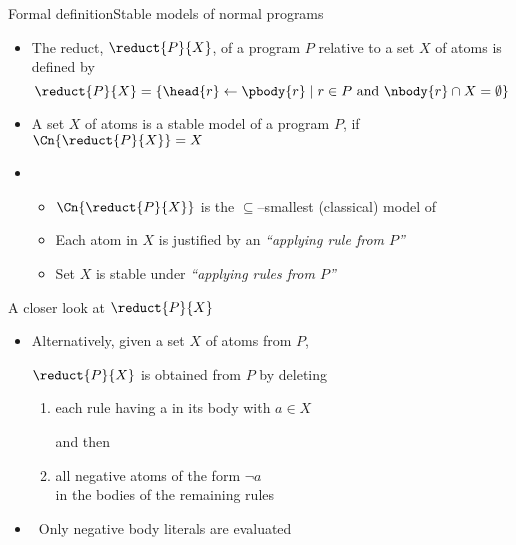 \begin{frame}{Formal definition}{Stable models of normal programs}

  \begin{itemize}
  \item <1-> The \alert{reduct}, $\reduct{P}{X}$, of a program $P$ relative to
    a set $X$ of atoms is defined by
    \[
    \reduct{P}{X}
    =
    \{\head{r}\leftarrow\pbody{r} \mid r\in P \text{ and } \nbody{r}\cap X=\emptyset\}
    \]

  \item <2-> A set $X$ of atoms is a \alert{stable model} of a program $P$,
    if $\Cn{\reduct{P}{X}}=X$
    \bigskip
    \bigskip
  \item<3-> 
    \begin{itemize}
    \item<3-> $\Cn{\reduct{P}{X}}$ is the $\subseteq$--smallest (classical) model of 
      \medskip
    \item<4-> Each atom in $X$ is justified by an \emph{``applying rule from $P$''}
    \item<4-> Set $X$ is \alert{stable} under \emph{``applying rules from $P$''}
    \end{itemize}
  \end{itemize}
\end{frame}
\begin{frame}{A closer look at ${\reduct{P}{X}}$}

  \bigskip
  \begin{itemize}
  \item<1->
    Alternatively, given a set $X$ of atoms from $P$,

    \bigskip

    $\reduct{P}{X}$ is obtained from $P$ by \alert<1>{deleting}

    \medskip

    \begin{enumerate}\normalsize
    \item each \alert<1>{rule} having \alert<2>{\neg a} in its body with $a\in X$

      and then

      \smallskip

    \item all \alert<1>{negative atoms} of the form \alert<2>{$\neg a$}  \\
      in the bodies of the remaining rules
    \end{enumerate}
    \bigskip
  \item<2->  \ Only \alert<2>{negative body literals} are evaluated
  \end{itemize}
\end{frame}
